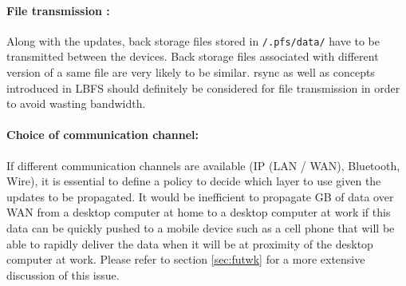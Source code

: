 \paragraph {File transmission :}
Along with the updates, back storage files stored in {\tt /.pfs/data/}
have to be transmitted between the devices. Back storage files
associated with different version of a same file are very likely to be
similar. rsync\cite{tridgell:rsync} as well as concepts introduced in
LBFS\cite{muthitacharoen:lbfs} should definitely be considered for
file transmission in order to avoid wasting bandwidth.

\paragraph {Choice of communication channel:}
If different communication channels are available (IP (LAN / WAN),
Bluetooth, Wire), it is essential to define a policy to decide which
layer to use given the updates to be propagated. It would be
inefficient to propagate GB of data over WAN from a desktop computer
at home to a desktop computer at work if this data can be quickly
pushed to a mobile device such as a cell phone that will be able to
rapidly deliver the data when it will be at proximity of the desktop
computer at work. Please refer to section \ref{sec:futwk} for a more
extensive discussion of this issue.

